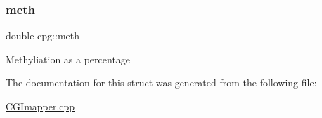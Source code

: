 \subsubsection{\texorpdfstring{meth}{meth}}
{\footnotesize\ttfamily double cpg\+::meth}

Methyliation as a percentage 

The documentation for this struct was generated from the following file\+:\begin{DoxyCompactItemize}
\item 
\hyperlink{CGImapper_8cpp}{C\+G\+Imapper.\+cpp}\end{DoxyCompactItemize}
